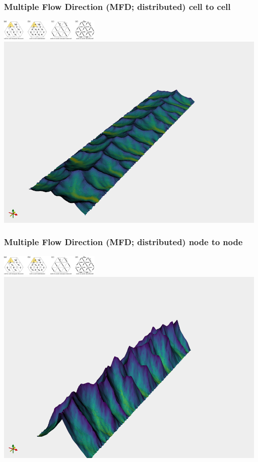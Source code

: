 \documentclass[aspectratio=169]{beamer}
\begin{document}
\begin{frame}
    \frametitle{Multiple Flow Direction (MFD; distributed) cell to cell}
    \centering
    \includegraphics[height=1cm]{./figures/MFDandSFD.png}
    \includegraphics[height=0.8\paperheight]{./figures/flem-mfd-c2c.png}
\end{frame}

\begin{frame}
    \frametitle{Multiple Flow Direction (MFD; distributed) node to node}
    \centering
    \includegraphics[height=1cm]{./figures/MFDandSFD.png}
    \includegraphics[height=0.8\paperheight]{./figures/flem-mfd-n2n.png}
\end{frame}
\end{document}
